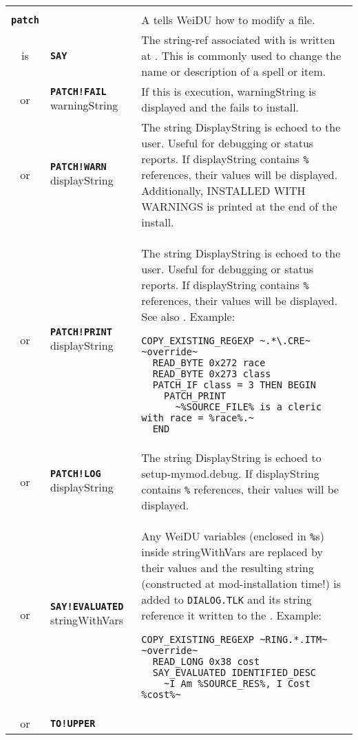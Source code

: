 \documentclass{article}
\def\ttref#1{\ahrefloc{#1}{\tt #1}}
\def\DEFINE#1{{\tt \bf #1}\label{#1}\index{#1}}
\def\DEFSYN#1{{\tt \bf #1}\index{#1}}
\def\t#1{{\tt #1}}
\begin{document}
\begin{tabular}{cp{10in}|p{10in}}
\\

\\

\DEFINE{patch} & & A \ttref{patch} tells WeiDU how to modify a file.  \\
is & \DEFSYN{SAY} \ttref{offset} \ttref{String} &
  The string-ref associated with \ttref{String} is written at
  \ttref{offset}. This is commonly used to change the name or
  description of a spell or item. \\
  or & \DEFINE{PATCH!FAIL} warningString &
    If this \ttref{TP2 Action} is execution, warningString is displayed and
    the \ttref{component} fails to install. \\
  or & \DEFINE{PATCH!WARN} displayString &
    The string DisplayString is echoed to the user. Useful for debugging or
    status reports. If displayString contains \t{\%}\ttref{variable}\t{\%}
    references, their values will be displayed. Additionally, INSTALLED WITH
    WARNINGS is printed at the end of the install.
    \\
  or & \DEFINE{PATCH!PRINT} displayString &
  The string DisplayString is echoed to the user. Useful for debugging or
  status reports. If displayString contains \t{\%}\ttref{variable}\t{\%}
  references, their values will be displayed. See also \ttref{PRINT}.
  Example:
\begin{verbatim}
COPY_EXISTING_REGEXP ~.*\.CRE~ ~override~
  READ_BYTE 0x272 race
  READ_BYTE 0x273 class
  PATCH_IF class = 3 THEN BEGIN
    PATCH_PRINT
      ~%SOURCE_FILE% is a cleric with race = %race%.~
  END
\end{verbatim} \\
  or & \DEFINE{PATCH!LOG} displayString &
    The string DisplayString is echoed to setup-mymod.debug.
    If displayString contains \t{\%}\ttref{variable}\t{\%}
    references, their values will be displayed. \\
or & \DEFINE{SAY!EVALUATED} \ttref{offset} stringWithVars &
  Any WeiDU variables (enclosed in \t{\%}s) inside stringWithVars are
  replaced by their values and the resulting string (constructed at
  mod-installation time!) is added to \t{DIALOG.TLK} and its string
  reference it written to the \ttref{offset}. Example:
\begin{verbatim}
COPY_EXISTING_REGEXP ~RING.*.ITM~ ~override~
  READ_LONG 0x38 cost
  SAY_EVALUATED IDENTIFIED_DESC
    ~I Am %SOURCE_RES%, I Cost %cost%~
\end{verbatim} \\
or & \DEFINE{TO!UPPER} \ttref{variable} &

\end{tabular}
\end{document}

